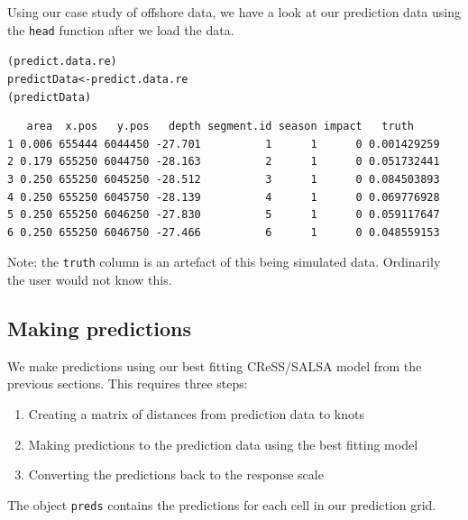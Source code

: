 \noindent Using our case study of offshore data, we have a look at our prediction data using the {\tt head} function after we load the data. 
\begin{knitrout}\footnotesize
{}\color{fgcolor}\begin{kframe}
\begin{alltt}
(predict.data.re)
predictData <- predict.data.re
(predictData)
\end{alltt}
\begin{verbatim}
   area  x.pos   y.pos   depth segment.id season impact   truth
1 0.006 655444 6044450 -27.701          1      1      0 0.001429259
2 0.179 655250 6044750 -28.163          2      1      0 0.051732441
3 0.250 655250 6045250 -28.512          3      1      0 0.084503893
4 0.250 655250 6045750 -28.139          4      1      0 0.069776928
5 0.250 655250 6046250 -27.830          5      1      0 0.059117647
6 0.250 655250 6046750 -27.466          6      1      0 0.048559153
\end{verbatim}
\end{kframe}
\end{knitrout}
\noindent Note: the {\tt truth} column is an artefact of this being simulated data.   Ordinarily the user would not know this.


\subsection{Making predictions}
\label{ss:off:predictions}
\noindent We make predictions using our best fitting CReSS/SALSA model from the previous sections. This requires three steps: 
\begin{enumerate}
\item{Creating a matrix of distances from prediction data to knots}
\item{Making predictions to the prediction data using the best fitting model}
\item{Converting the predictions back to the response scale}
\end{enumerate}
\begin{knitrout}\footnotesize
{}\color{fgcolor}
\end{knitrout}
\noindent The object {\tt preds} contains the predictions for each cell in our prediction grid. 


